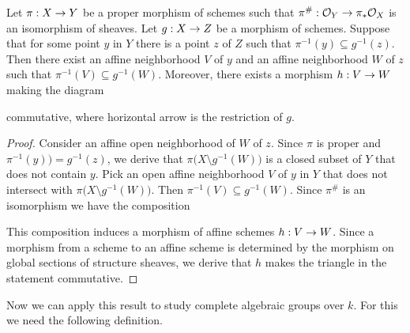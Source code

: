 \begin{theorem}[Rigidity]\label{theorem:rigidity_result}
Let $\pi:X\rightarrow Y$ be a proper morphism of schemes such that $\pi^{\#}:{\mathcal O}_Y\rightarrow \pi_*{\mathcal O}_X$ is an isomorphism of sheaves. Let $g:X\rightarrow Z$ be a morphism of schemes. Suppose that for some point $y$ in $Y$ there is a point $z$ of $Z$ such that $\pi^{-1}(y)\subseteq g^{-1}(z)$. Then there exist an affine neighborhood $V$ of $y$ and an affine neighborhood $W$ of $z$ such that $\pi^{-1}(V) \subseteq g^{-1}(W)$. Moreover, there exists a morphism $h:V\rightarrow W$ making the diagram
\begin{center}
\end{center}
commutative, where horizontal arrow is the restriction of $g$.
\end{theorem}
\begin{proof}
Consider an affine open neighborhood of $W$ of $z$. Since $\pi$ is proper and $\pi^{-1}(y)) = g^{-1}(z)$, we derive that $\pi\big(X\setminus g^{-1}(W)\big)$ is a closed subset of $Y$ that does not contain $y$. Pick an open affine neighborhood $V$ of $y$ in $Y$ that does not intersect with $\pi\big(X\setminus g^{-1}(W)\big)$. Then $\pi^{-1}(V) \subseteq g^{-1}(W)$. Since $\pi^{\#}$ is an isomorphism we have the composition
\begin{center}
\end{center}
This composition induces a morphism of affine schemes $h:V\rightarrow W$. Since a morphism from a scheme to an affine scheme is determined by the morphism on global sections of structure sheaves, we derive that $h$ makes the triangle in the statement commutative.
\end{proof}
\noindent
Now we can apply this result to study complete algebraic groups over $k$. For this we need the following definition.

